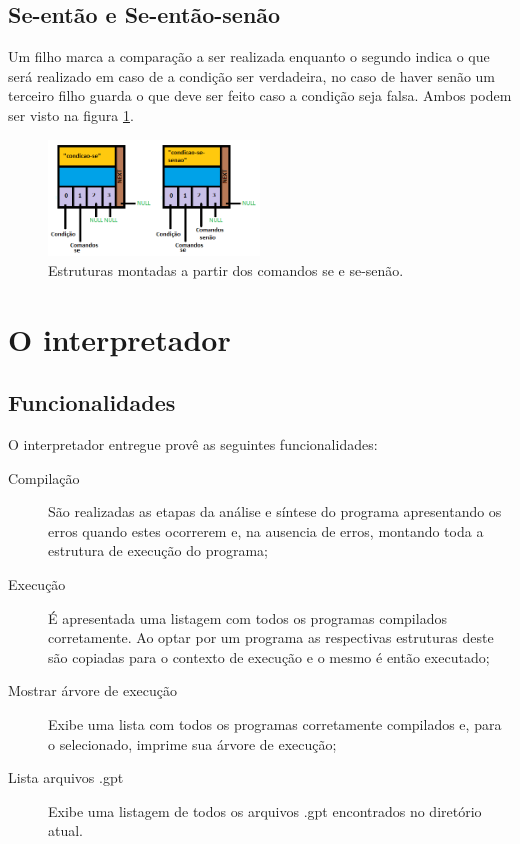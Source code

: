 \documentclass[a4paper,12pt]{report}
\begin{document}
\subsection{Se-ent\~ao e Se-ent\~ao-sen\~ao}

Um filho marca a compara\c{c}\~ao a ser realizada enquanto o segundo indica o que ser\'a realizado em caso de a condi\c{c}\~ao ser verdadeira, no caso de haver sen\~ao um terceiro filho guarda o que deve ser feito caso a condi\c{c}\~ao seja falsa. Ambos podem ser visto na figura \ref{fig:se}.

\begin{figure}
\centering
\includegraphics[width=0.5\textwidth]{imgs/se_e_se-senao.png}
\caption{\label{fig:se}Estruturas montadas a partir dos comandos se e se-sen\~ao.}
\end{figure}

\section{O interpretador}

\subsection{Funcionalidades}

O interpretador entregue prov\^e as seguintes funcionalidades: 

\begin{description}
\item[Compila\c{c}\~ao] S\~ao realizadas as etapas da an\'alise e s\'intese do programa apresentando os erros quando estes ocorrerem e, na ausencia de erros, montando toda a estrutura de execu\c{c}\~ao do programa;
\item[Execu\c{c}\~ao] \'E apresentada uma listagem com todos os programas compilados corretamente. Ao optar por um programa as respectivas estruturas deste s\~ao copiadas para o contexto de execu\c{c}\~ao e o mesmo \'e ent\~ao executado;
\item[Mostrar \'arvore de execu\c{c}\~ao] Exibe uma lista com todos os programas corretamente compilados e, para o selecionado, imprime sua \'arvore de execu\c{c}\~ao;
\item[Lista arquivos .gpt] Exibe uma listagem de todos os arquivos .gpt encontrados no diret\'orio atual.
\end{description}
\end{document}
